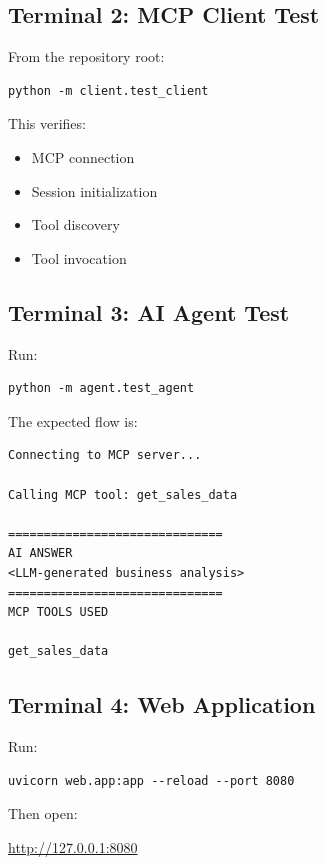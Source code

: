 \documentclass[11pt,a4paper]{article}
\begin{document}
\subsection{Terminal 2: MCP Client Test}

From the repository root:

\begin{lstlisting}[style=terminal]
python -m client.test_client
\end{lstlisting}

This verifies:

\begin{itemize}
\item MCP connection
\item Session initialization
\item Tool discovery
\item Tool invocation
\end{itemize}

\subsection{Terminal 3: AI Agent Test}

Run:

\begin{lstlisting}[style=terminal]
python -m agent.test_agent
\end{lstlisting}

The expected flow is:

\begin{lstlisting}[style=terminal]
Connecting to MCP server...

Calling MCP tool: get_sales_data

==============================
AI ANSWER
<LLM-generated business analysis>
==============================
MCP TOOLS USED

get_sales_data
\end{lstlisting}

\subsection{Terminal 4: Web Application}

Run:

\begin{lstlisting}[style=terminal]
uvicorn web.app:app --reload --port 8080
\end{lstlisting}

Then open:

\begin{center}
\url{http://127.0.0.1:8080}
\end{center}
\end{document}
